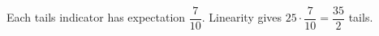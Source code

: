 Each tails indicator has expectation $\dfrac{7}{10}$. Linearity gives $25\cdot\dfrac{7}{10}=\boxed{\dfrac{35}{2}}$ tails.
